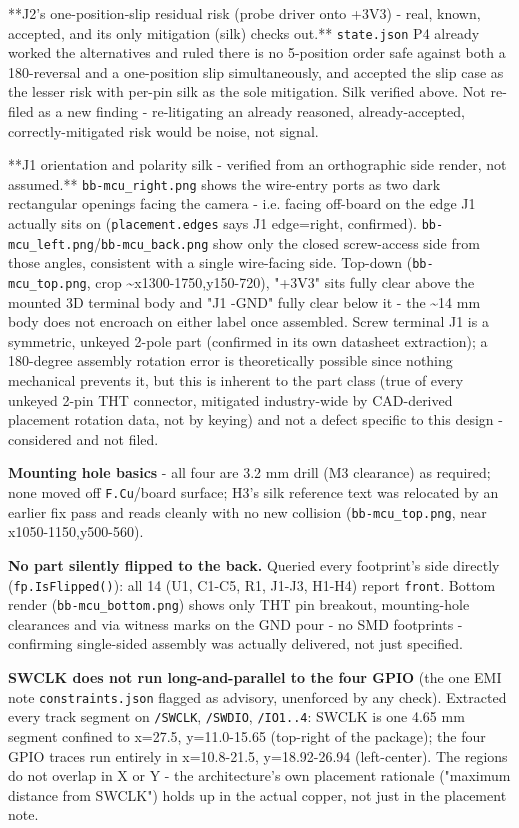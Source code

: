 \documentclass[11pt,a4paper]{article}
\begin{document}
{*}{*}J2's one-position-slip residual risk (probe driver onto +3V3) - real, known, accepted, and its only mitigation (silk) checks out.{*}{*} \texttt{state.json} P4 already worked the alternatives and ruled there is no 5-position order safe against both a 180-reversal and a one-position slip simultaneously, and accepted the slip case as the lesser risk with per-pin silk as the sole mitigation. Silk verified above. Not re-filed as a new finding - re-litigating an already reasoned, already-accepted, correctly-mitigated risk would be noise, not signal.

{*}{*}J1 orientation and polarity silk - verified from an orthographic side render, not assumed.{*}{*} \texttt{bb-mcu\_right.png} shows the wire-entry ports as two dark rectangular openings facing the camera - i.e. facing off-board on the edge J1 actually sits on (\texttt{placement.edges} says J1 edge=right, confirmed). \texttt{bb-mcu\_left.png}/\texttt{bb-mcu\_back.png} show only the closed screw-access side from those angles, consistent with a single wire-facing side. Top-down (\texttt{bb-mcu\_top.png}, crop \textasciitilde{}x1300-1750,y150-720), "+3V3" sits fully clear above the mounted 3D terminal body and "J1 -GND" fully clear below it - the \textasciitilde{}14 mm body does not encroach on either label once assembled. Screw terminal J1 is a symmetric, unkeyed 2-pole part (confirmed in its own datasheet extraction); a 180-degree assembly rotation error is theoretically possible since nothing mechanical prevents it, but this is inherent to the part class (true of every unkeyed 2-pin THT connector, mitigated industry-wide by CAD-derived placement rotation data, not by keying) and not a defect specific to this design - considered and not filed.

\textbf{Mounting hole basics} - all four are 3.2 mm drill (M3 clearance) as required; none moved off \texttt{F.Cu}/board surface; H3's silk reference text was relocated by an earlier fix pass and reads cleanly with no new collision (\texttt{bb-mcu\_top.png}, near x1050-1150,y500-560).

\textbf{No part silently flipped to the back.} Queried every footprint's side directly (\texttt{fp.IsFlipped()}): all 14 (U1, C1-C5, R1, J1-J3, H1-H4) report \texttt{front}. Bottom render (\texttt{bb-mcu\_bottom.png}) shows only THT pin breakout, mounting-hole clearances and via witness marks on the GND pour - no SMD footprints - confirming single-sided assembly was actually delivered, not just specified.

\textbf{SWCLK does not run long-and-parallel to the four GPIO} (the one EMI note \texttt{constraints.json} flagged as advisory, unenforced by any check). Extracted every track segment on \texttt{/SWCLK}, \texttt{/SWDIO}, \texttt{/IO1..4}: SWCLK is one 4.65 mm segment confined to x=27.5, y=11.0-15.65 (top-right of the package); the four GPIO traces run entirely in x=10.8-21.5, y=18.92-26.94 (left-center). The regions do not overlap in X or Y - the architecture's own placement rationale ("maximum distance from SWCLK") holds up in the actual copper, not just in the placement note.
\end{document}
